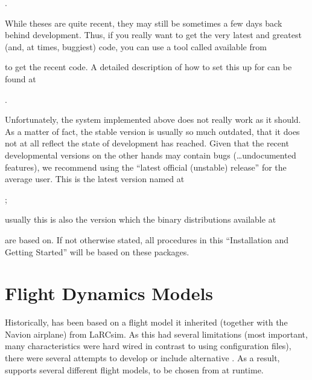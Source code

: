 .
 \medskip

 \noindent
While theses are quite recent, they may still be sometimes a few days back behind
development. Thus, if you really want to get the very latest and greatest (and, at times,
buggiest) code, you can use a tool called 
available from
 \medskip

 \medskip

 \noindent
to get the recent code. A detailed description of how to set this up for \FlightGear{}
can be found at
 \medskip

.
 \medskip

 \noindent
 Unfortunately, the system implemented above does not really work as it should. As a matter of
 fact, the stable version is usually so much outdated, that it does not at all reflect the state
 of development \FlightGear{} has reached. Given that the recent developmental versions on the
 other hands may contain bugs (\ldots undocumented features), we recommend using the
 ``latest official (unstable) release'' for the average user. This is the latest version named at

 ;
 \medskip

\noindent
 usually this is also the version which the binary distributions
 available at
 \medskip

 \medskip

 \noindent
 are based on. If not otherwise stated, all procedures in this ``Installation and Getting Started''
 will be based on these packages.

\section{Flight Dynamics Models\label{flight models}}
Historically, \FlightGear{} has been based on a flight model it inherited (together
with the Navion airplane) from LaRCsim. As this had several limitations (most important,
many characteristics were hard wired in contrast to using configuration files), there were
several attempts to develop or include alternative . As a result,
\FlightGear{} supports several different flight models, to be chosen from at runtime.

